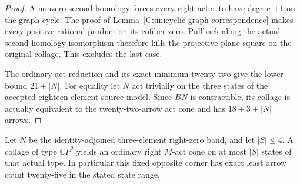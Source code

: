 \begin{proof}
A nonzero second homology forces every right actor to have
degree $+1$ on the graph cycle. The proof of
Lemma~\ref{C:unicyclic-graph-correspondence} makes every
positive rational product on its cofiber zero. Pullback
along the actual second-homology isomorphism therefore kills
the projective-plane square on the original collage. This
excludes the last case.

The ordinary-act reduction and its exact minimum twenty-two
give the lower bound $21+|N|$. For equality let $N$ act
trivially on the three states of the accepted eighteen-element
source model. Since $BN$ is contractible, its collage is
actually equivalent to the twenty-two-arrow act cone and
has $18+3+|N|$ arrows.
\end{proof}

\begin{theorem}
\label{C:right-zero-three-four-states}
Let $N$ be the identity-adjoined three-element right-zero band,
and let $|S|\leq4$. A collage of type $\mathbb CP^2$ yields
an ordinary right $M$-act cone on at most $|S|$ states of that
actual type. In particular this fixed opposite corner has
exact least arrow count twenty-five in the stated state range.
\end{theorem}
